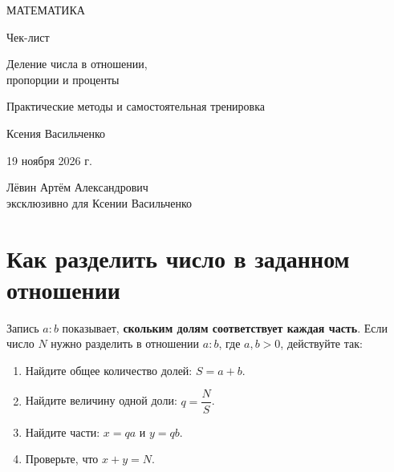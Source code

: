 \documentclass[a4paper,12pt]{article}
\newcommand{\key}[1]{\textcolor{darkaccent}{\textbf{#1}}}
\begin{document}
\hypersetup{pageanchor=false}
\begin{titlepage}
\thispagestyle{empty}
\centering
\vspace*{27mm}
{\color{darkaccent}\Large МАТЕМАТИКА\par}
\vspace{21mm}
{\LARGE Чек-лист\par}
\vspace{15mm}
{\color{accent}\LARGE Деление числа в отношении,\\[3pt] пропорции и проценты\par}
\vspace{18mm}
{\normalsize Практические методы и самостоятельная тренировка\par}
\vfill
{\large Ксения Васильченко\par}
\vspace{12mm}
{\normalsize 19 ноября 2026 г.\par}
\vspace{18mm}
{\small Лёвин Артём Александрович\\ эксклюзивно для Ксении Васильченко\par}
\vspace{17mm}
\vspace{8mm}
\end{titlepage}
\hypersetup{pageanchor=true}

\section{Как разделить число в заданном отношении}

Запись \(a:b\) показывает, \key{скольким долям соответствует каждая часть}. Если число \(N\) нужно разделить в отношении \(a:b\), где \(a,b>0\), действуйте так:
\begin{enumerate}
\item Найдите общее количество долей: \(S=a+b\).
\item Найдите величину одной доли: \(q=\dfrac{N}{S}\).
\item Найдите части: \(x=qa\) и \(y=qb\).
\item Проверьте, что \(x+y=N\).
\end{enumerate}
\end{document}
